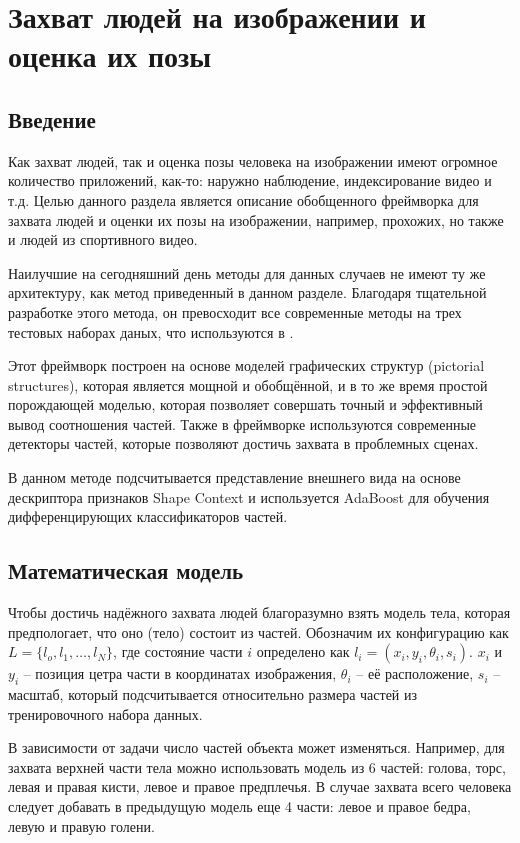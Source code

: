 \section{Захват людей на изображении и оценка их позы}

\subsection{Введение}

Как захват людей, так и оценка позы человека на изображении имеют огромное количество приложений, как-то: наружно наблюдение, индексирование видео и т.д. Целью данного раздела является описание обобщенного фреймворка для захвата людей и оценки их позы на изображении, например, прохожих, но также и людей из спортивного видео.

Наилучшие на сегодняшний день методы для данных случаев не имеют ту же архитектуру, как метод приведенный в данном разделе. Благодаря тщательной разработке этого метода, он превосходит все современные методы на трех тестовых наборах даных, что используются в \cite{andriluka09}.

Этот фреймворк построен на основе моделей графических структур (pictorial structures), которая является мощной и обобщённой, и в то же время простой порождающей моделью, которая позволяет совершать точный и эффективный вывод соотношения частей. Также в фреймворке используются современные детекторы частей, которые позволяют достичь захвата в проблемных сценах.

В данном методе подсчитывается представление внешнего вида на основе дескриптора признаков Shape Context и используется AdaBoost для обучения дифференцирующих классификаторов частей.

\subsection{Математическая модель}

Чтобы достичь надёжного захвата людей благоразумно взять модель тела, которая предпологает, что оно (тело) состоит из частей. Обозначим их конфигурацию как \(L = \{l_o, l_1, \dots, l_N\}\), где состояние части \(i\) определено как \(l_i = (x_i, y_i, \theta_i, s_i)\). \(x_i\) и \(y_i\) -- позиция цетра части в координатах изображения, \(\theta_i\) -- её расположение, \(s_i\) -- масштаб, который подсчитывается относительно размера частей из тренировочного набора данных.

В зависимости от задачи число частей объекта может изменяться. Например, для захвата верхней части тела можно использовать модель из 6 частей: голова, торс, левая и правая кисти, левое и правое предплечья. В случае захвата всего человека следует добавать в предыдущую модель еще 4 части: левое и правое бедра, левую и правую голени.

